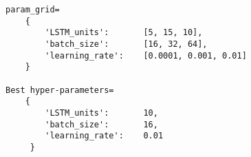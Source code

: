 \begin{lstlisting}
param_grid=
    {
        'LSTM_units':       [5, 15, 10],
        'batch_size':       [16, 32, 64],
        'learning_rate':    [0.0001, 0.001, 0.01]
    }

Best hyper-parameters=
    {
        'LSTM_units':       10,
        'batch_size':       16, 
        'learning_rate':    0.01
     }
\end{lstlisting}


